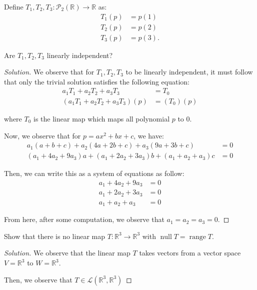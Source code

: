 \documentclass[openany]{book}
\newenvironment{solution}{\begin{proof}[Solution]}{\end{proof}}
\newcommand{\RR}{\mathbb{R}}
\DeclareMathOperator*{\vnull}{null}
\DeclareMathOperator*{\vrange}{range}
\begin{document}
\begin{hw}
	Define $T_{1}, T_{2}, T_{3} : \mathscr{P}_{2}(\RR) \rightarrow \RR$ as:
	\begin{align*}
		T_{1}(p) &= p(1) \\
		T_{2}(p) &= p(2) \\
		T_{3}(p) &= p(3).
	\end{align*}
	
	Are $T_{1}, T_{2}, T_{3}$ linearly independent?
\end{hw}
\begin{solution}
	We observe that for $T_{1}, T_{2}, T_{3}$ to be linearly independent, it must follow that only the trivial solution satisfies the following equation:
	\begin{align*}
		a_{1}T_{1} + a_{2}T_{2} + a_{3}T_{3} &= T_{0} \\
		(a_{1}T_{1} + a_{2}T_{2} + a_{3}T_{3})(p) &= (T_{0})(p)
	\end{align*}

	where $T_{0}$ is the linear map which maps all polynomial $p$ to 0.
	
	Now, we observe that for $p = ax^{2} + bx + c$, we have:
	\begin{align*}
		a_{1}(a+b+c) + a_{2}(4a + 2b + c) + a_{3}(9a + 3b + c) &= 0 \\
		(a_{1} + 4a_{2} + 9a_{3})a + (a_{1} + 2a_{2} + 3a_{3})b + (a_{1} + a_{2} + a_{3})c &= 0
	\end{align*}

	Then, we can write this as a system of equations as follow:
	\begin{align*}
		a_{1} + 4a_{2} + 9a_{3} &= 0 \\
		a_{1} + 2a_{2} + 3a_{3} &= 0 \\
		a_{1} + a_{2} + a_{3} &= 0
	\end{align*}

	From here, after some computation, we observe that $a_{1} = a_{2} = a_{3} = 0$.
\end{solution}

\begin{hw}
	Show that there is no linear map $T : \RR^{3} \rightarrow \RR^{3}$ with $\vnull T = \vrange T$.
\end{hw}
\begin{solution}
	We observe that the linear map $T$ takes vectors from a vector space $V = \RR^{3}$ to $W = \RR^{3}$.
	
	Then, we observe that $T \in \mathcal{L}(\RR^{3}, \RR^{3})$
\end{solution}
\end{document}

